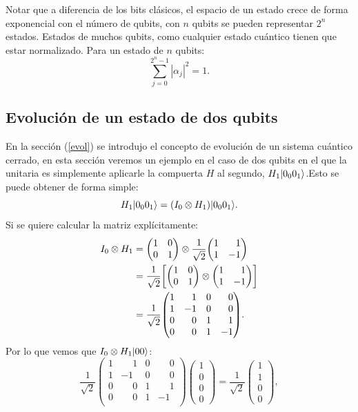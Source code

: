 Notar que a diferencia de los bits clásicos, el espacio de un estado crece de forma exponencial con el número de qubits, con $n$ qubits se pueden representar $2^n$ estados. Estados de muchos qubits, como cualquier estado cuántico tienen que estar normalizado. Para un estado de $n$ qubits:
\begin{equation}
  \sum_{j = 0}^{2^n-1} |\alpha_j|^2 = 1.
\end{equation}

\subsection{Evolución de un estado de dos qubits}
En la sección (\ref{evol}) se introdujo el concepto de evolución de un sistema cuántico cerrado, en esta sección veremos un ejemplo en el caso de dos qubits en el que la unitaria es simplemente aplicarle la compuerta $H$ al segundo, $H_1\ket{0_0 0_1}$.Esto se puede obtener de forma simple:
\begin{equation}
  H_1\ket{0_0 0_1} = (I_0 \otimes H_1)\ket{0_0 0_1}.
\end{equation}
Si se quiere calcular la matriz explícitamente:
\begin{align}
  I_0 \otimes H_1 &=
  \igate{} \otimes \hgate{} \\
  &=
  \dfrac{1}{\sqrt2}
  \left[
    \igate{}
    \otimes
    \begin{pmatrix}
      1 & \phantom{-}1 \\
      1 & -1
    \end{pmatrix}
  \right] \\
&= \dfrac{1}{\sqrt2}
  \begin{pmatrix}
    1 & \phantom{-}1 & 0 & \phantom{-}0 \\
    1 & -1 & 0 & \phantom{-}0 \\
    0 & \phantom{-}0 & 1 & \phantom{-}1 \\
    0 & \phantom{-}0 & 1 & -1 \\
  \end{pmatrix}.
\end{align}
Por lo que vemos que $I_0 \otimes H_1 \ket{00}$:
\begin{equation}
  \dfrac{1}{\sqrt2}
  \begin{pmatrix}
    1 & \phantom{-}1 & 0 & \phantom{-}0 \\
    1 & -1 & 0 & \phantom{-}0 \\
    0 & \phantom{-}0 & 1 & \phantom{-}1 \\
    0 & \phantom{-}0 & 1 & -1 \\
  \end{pmatrix}
  \begin{pmatrix}
    1 \\
    0 \\
    0 \\
    0
  \end{pmatrix}
  =
  \dfrac{1}{\sqrt2}
  \begin{pmatrix}
    1 \\
    1 \\
    0 \\
    0
  \end{pmatrix},
\end{equation}
